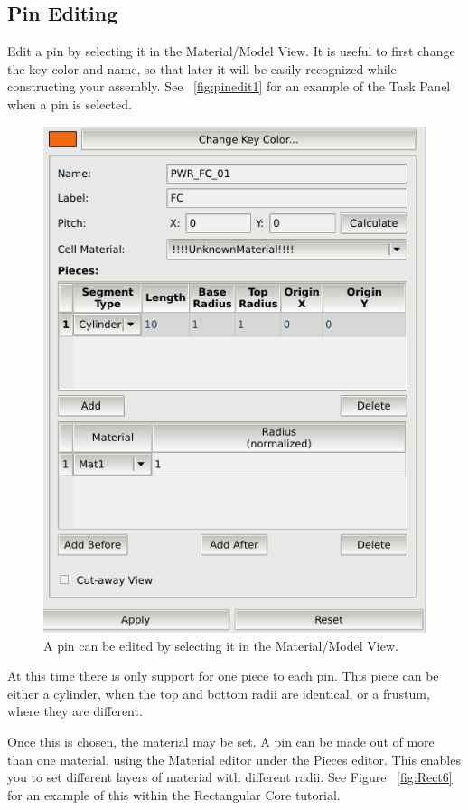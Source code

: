 \subsection{Pin Editing}
Edit a pin by selecting it in the Material/Model View.  It is useful to first change the key color and name, so that later it will be easily recognized while constructing your assembly.  See ~\ref{fig:pinedit1} for an example of the Task Panel when a pin is selected.

\begin{figure}
\begin{center}
\includegraphics[width=0.6\linewidth]{Images/pin-editing.png}
\caption{A pin can be edited by selecting it in the Material/Model View.}
\label{fig:ductedit1}
\end{center}
\end{figure}


At this time there is only support for one piece to each pin.  This piece can be either a cylinder, when the top and bottom radii are identical, or a frustum, where they are different.

Once this is chosen, the material may be set.  A pin can be made out of more than one material, using the Material editor under the Pieces editor.  This enables you to set different layers of material with different radii.  See Figure ~\ref{fig:Rect6} for an example of this within the Rectangular Core tutorial.